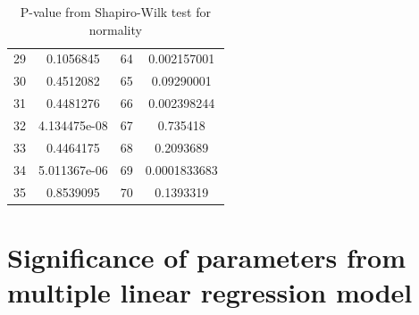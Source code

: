 \begin{table}
\begin{tabular}{c:c|c:c}
        29 & 0.1056845 & 64 & 0.002157001\\ 
        30 & 0.4512082 & 65 & 0.09290001\\ 
        31 & 0.4481276 & 66 & 0.002398244\\ 
        32 & 4.134475e-08 & 67 & 0.735418\\ 
        33 & 0.4464175 & 68 & 0.2093689\\ 
        34 & 5.011367e-06 & 69 & 0.0001833683 \\ 
        35 & 0.8539095 & 70 & 0.1393319\\
        \hline
    \end{tabular}
    \caption{P-value from Shapiro-Wilk test for normality}
    \label{tab: shapiro_simple_lm}
\end{table}

\section{Significance of parameters from multiple linear regression model}

